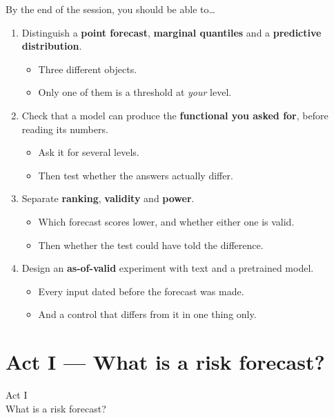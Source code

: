 \documentclass[9pt, aspectratio=169, t]{beamer}
\begin{document}
\begin{frame}{By the end of the session, you should be able to\ldots}
  \begin{enumerate}
    \item Distinguish a \textbf{point forecast}, \textbf{marginal quantiles} and a
          \textbf{predictive distribution}.
      \begin{itemize}
        \item Three different objects.
        \item Only one of them is a threshold at \emph{your} level.
      \end{itemize}
    \item Check that a model can produce the \textbf{functional you asked for},
          before reading its numbers.
      \begin{itemize}
        \item Ask it for several levels.
        \item Then test whether the answers actually differ.
      \end{itemize}
    \item Separate \textbf{ranking}, \textbf{validity} and \textbf{power}.
      \begin{itemize}
        \item Which forecast scores lower, and whether either one is valid.
        \item Then whether the test could have told the difference.
      \end{itemize}
    \item Design an \textbf{as-of-valid} experiment with text and a pretrained model.
      \begin{itemize}
        \item Every input dated before the forecast was made.
        \item And a control that differs from it in one thing only.
      \end{itemize}
  \end{enumerate}
\end{frame}

\section{Act I --- What is a risk forecast?}
\begin{frame}[plain]
  \centering\vfill
  {\Large\textcolor{IDAred}{Act I}}\\[0.4em]
  {\large What is a risk forecast?}
  \vfill
\end{frame}
\end{document}
